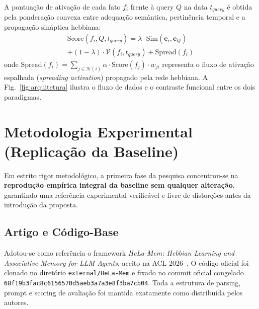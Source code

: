 \documentclass[10pt,conference,twocolumn]{IEEEtran}
\begin{document}
A pontuação de ativação de cada fato $f_i$ frente à query $Q$ na data $t_{query}$ é obtida pela ponderação convexa entre adequação semântica, pertinência temporal e a propagação sináptica hebbiana:
\begin{multline}
\text{Score}(f_i, Q, t_{query}) = \lambda \cdot \text{Sim}(\mathbf{e}_i, \mathbf{e}_Q) \\
+ (1-\lambda) \cdot \mathcal{V}(f_i, t_{query}) + \text{Spread}(f_i)
\end{multline}
onde $\text{Spread}(f_i) = \sum_{j \in \mathcal{N}(i)} \alpha \cdot \text{Score}(f_j) \cdot w_{ji}$ representa o fluxo de ativação espalhada (\textit{spreading activation}) propagado pela rede hebbiana. A Fig.~\ref{fig:arquitetura} ilustra o fluxo de dados e o contraste funcional entre os dois paradigmas.

\section{Metodologia Experimental (Replicação da Baseline)}

Em estrito rigor metodológico, a primeira fase da pesquisa concentrou-se na \textbf{reprodução empírica integral da baseline sem qualquer alteração}, garantindo uma referência experimental verificável e livre de distorções antes da introdução da proposta.

\subsection{Artigo e Código-Base}
Adotou-se como referência o framework \textit{HeLa-Mem: Hebbian Learning and Associative Memory for LLM Agents}, aceito na ACL 2026~\cite{helamem2026}. O código oficial foi clonado no diretório \texttt{external/HeLa-Mem} e fixado no commit oficial congelado \texttt{68f19b3fac8c6156570d5aeb3a7a3e8f3ba7cb04}. Toda a estrutura de parsing, prompt e scoring de avaliação foi mantida exatamente como distribuída pelos autores.
\end{document}
